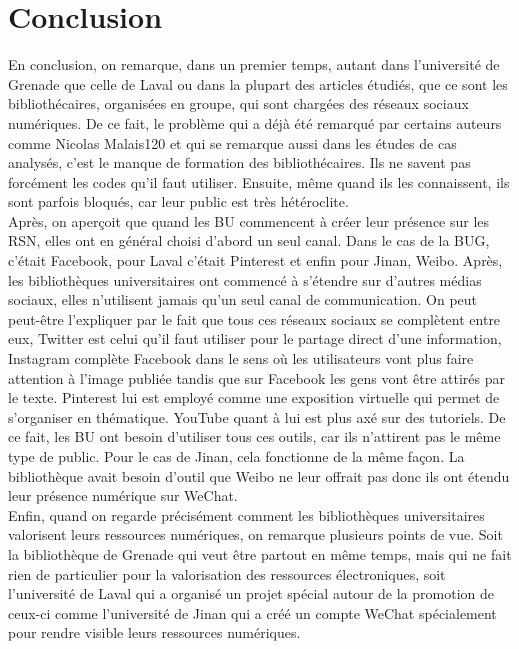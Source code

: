 \documentclass[a4paper,11pt]{article} %
\begin{document}
\section{Conclusion} %

En conclusion, on remarque, dans un premier temps, autant dans l’université de Grenade que celle de Laval ou dans la plupart des articles étudiés, que ce sont les bibliothécaires, organisées en groupe, qui sont chargées des réseaux sociaux numériques. De ce fait, le problème qui a déjà été remarqué par certains auteurs comme Nicolas Malais120 et qui se remarque aussi dans les études de cas analysés, c’est le manque de formation des bibliothécaires. Ils ne savent 
pas forcément les codes qu’il faut utiliser. Ensuite, même quand ils les connaissent, ils sont 
parfois bloqués, car leur public est très hétéroclite. 
\\ Après, on aperçoit que quand les BU commencent à créer leur présence sur les RSN, elles ont en général choisi d’abord un seul canal. Dans le cas de la BUG, c’était Facebook, pour Laval c’était Pinterest et enfin pour Jinan, Weibo. Après, les bibliothèques universitaires ont commencé à s’étendre sur d’autres médias sociaux, elles n’utilisent jamais qu’un seul canal de communication. On peut peut-être l’expliquer par le fait que tous ces réseaux sociaux se complètent entre eux, Twitter est celui qu’il faut utiliser pour le partage direct d’une information, Instagram complète Facebook dans le sens où les utilisateurs vont plus faire attention à l’image publiée tandis que sur Facebook les gens vont être attirés par le texte. 
Pinterest lui est employé comme une exposition virtuelle qui permet de s’organiser en thématique. YouTube quant à lui est plus axé sur des tutoriels. De ce fait, les BU ont besoin d’utiliser tous ces outils, car ils n’attirent pas le même type de public. Pour le cas de Jinan, cela fonctionne de la même façon. La bibliothèque avait besoin d’outil que Weibo ne leur offrait pas donc ils ont étendu leur présence numérique sur WeChat. 
\\Enfin, quand on regarde précisément comment les bibliothèques universitaires 
valorisent leurs ressources numériques, on remarque plusieurs points de vue. Soit la 
bibliothèque de Grenade qui veut être partout en même temps, mais qui ne fait rien de particulier 
pour la valorisation des ressources électroniques, soit l’université de Laval qui a organisé un 
projet spécial autour de la promotion de ceux-ci comme l’université de Jinan qui a créé un 
compte WeChat spécialement pour rendre visible leurs ressources numériques.

\end{document}
